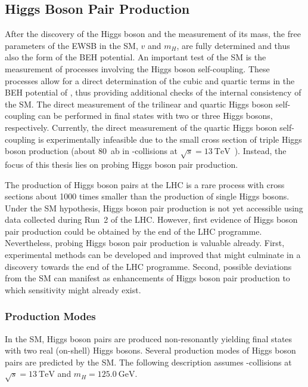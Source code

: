 \subsection{Higgs Boson Pair Production}%
\label{fig:theory_higgs_pair_prod}

After the discovery of the Higgs boson and the measurement of its mass, the free
parameters of the EWSB in the SM, $v$ and $m_H$, are fully determined and thus
also the form of the BEH potential. An important test of the SM is the
measurement of processes involving the Higgs boson self-coupling. These
processes allow for a direct determination of the cubic and quartic terms in the
BEH potential of , thus providing additional checks of
the internal consistency of the SM. The direct measurement of the trilinear and
quartic Higgs boson self-coupling can be performed in final states with two or
three Higgs bosons, respectively. Currently, the direct measurement of the
quartic Higgs boson self-coupling is experimentally infeasible due to the small
cross section of triple Higgs boson production (about \SI{80}{\atto\barn} in
\pp-collisions at $\sqrt{s} = \SI{13}{\TeV}$~\cite{Maltoni:2014eza}). Instead,
the focus of this thesis lies on probing Higgs boson pair production.

The production of Higgs boson pairs at the LHC is a rare process with cross
sections about 1000 times smaller than the production of single Higgs
bosons. Under the SM hypothesis, Higgs boson pair production is not yet
accessible using data collected during Run~2 of the LHC. However, first evidence
of Higgs boson pair production could be obtained by the end of the LHC
programme. Nevertheless, probing Higgs boson pair production is valuable
already. First, experimental methods can be developed and improved that might
culminate in a discovery towards the end of the LHC programme. Second, possible
deviations from the SM can manifest as enhancements of Higgs boson pair
production to which sensitivity might already exist.


\subsubsection{Production Modes}%

In the SM, Higgs boson pairs are produced non-resonantly yielding final states
with two real (on-shell) Higgs bosons. Several production modes of Higgs boson
pairs are predicted by the SM. The following description assumes \pp-collisions
at $\sqrt{s} = \SI{13}{\TeV}$ and $m_{H} = \SI{125.0}{\GeV}$.

